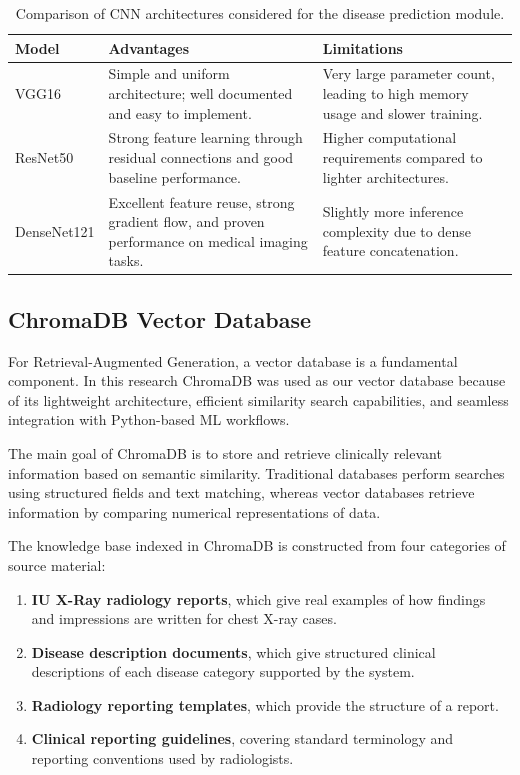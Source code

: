 \vspace{1em}
\begin{table}[H]
    \centering
    \caption{Comparison of CNN architectures considered for the disease prediction module.}
    \label{tab:cnn-comparison}
    \begin{tabular}{p{2.8cm} p{5.5cm} p{5.5cm}}
        \toprule
        \textbf{Model} & \textbf{Advantages} & \textbf{Limitations} \\
        \midrule
        VGG16
            & Simple and uniform architecture; well documented and easy to implement.
            & Very large parameter count, leading to high memory usage and slower training. \\
        \addlinespace
        ResNet50
            & Strong feature learning through residual connections and good baseline performance.
            & Higher computational requirements compared to lighter architectures. \\
        \addlinespace
        DenseNet121
            & Excellent feature reuse, strong gradient flow, and proven performance on medical
              imaging tasks.
            & Slightly more inference complexity due to dense feature concatenation. \\
        \bottomrule
    \end{tabular}
\end{table}

\subsection{ChromaDB Vector Database}

For Retrieval-Augmented Generation, a vector database is a fundamental component. In this
research ChromaDB was used as our vector database because of its lightweight architecture,
efficient similarity search capabilities, and seamless integration with Python-based ML
workflows.

The main goal of ChromaDB is to store and retrieve clinically relevant information based on
semantic similarity. Traditional databases perform searches using structured fields and text
matching, whereas vector databases retrieve information by comparing numerical
representations of data.

The knowledge base indexed in ChromaDB is constructed from four categories of source
material:

\begin{enumerate}
    \item \textbf{IU X-Ray radiology reports}, which give real examples of how findings and
    impressions are written for chest X-ray cases.
    \item \textbf{Disease description documents}, which give structured clinical descriptions of
    each disease category supported by the system.
    \item \textbf{Radiology reporting templates}, which provide the structure of a report.
    \item \textbf{Clinical reporting guidelines}, covering standard terminology and reporting
    conventions used by radiologists.
\end{enumerate}

